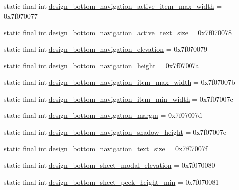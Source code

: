 \begin{CompactItemize}
\item 
static final int \hyperlink{classandroid_1_1support_1_1graphics_1_1drawable_1_1_r_1_1dimen_e7fb8b9626fbe0415f1e3fbb13848d85}{design\_\-bottom\_\-navigation\_\-active\_\-item\_\-max\_\-width} = 0x7f070077
\item 
static final int \hyperlink{classandroid_1_1support_1_1graphics_1_1drawable_1_1_r_1_1dimen_30f5289605b74695929a1f8a3bab29cb}{design\_\-bottom\_\-navigation\_\-active\_\-text\_\-size} = 0x7f070078
\item 
static final int \hyperlink{classandroid_1_1support_1_1graphics_1_1drawable_1_1_r_1_1dimen_83858ab1d4aced4f73dae5b98a084a3f}{design\_\-bottom\_\-navigation\_\-elevation} = 0x7f070079
\item 
static final int \hyperlink{classandroid_1_1support_1_1graphics_1_1drawable_1_1_r_1_1dimen_f8be17b12ea22ec88e5fa56094b23032}{design\_\-bottom\_\-navigation\_\-height} = 0x7f07007a
\item 
static final int \hyperlink{classandroid_1_1support_1_1graphics_1_1drawable_1_1_r_1_1dimen_b6dc3d7032025eedeadc9113a0210506}{design\_\-bottom\_\-navigation\_\-item\_\-max\_\-width} = 0x7f07007b
\item 
static final int \hyperlink{classandroid_1_1support_1_1graphics_1_1drawable_1_1_r_1_1dimen_0c888544ed3e55d1eba64bf35f028dc1}{design\_\-bottom\_\-navigation\_\-item\_\-min\_\-width} = 0x7f07007c
\item 
static final int \hyperlink{classandroid_1_1support_1_1graphics_1_1drawable_1_1_r_1_1dimen_28c6137cce000b1b48f3711627c66abc}{design\_\-bottom\_\-navigation\_\-margin} = 0x7f07007d
\item 
static final int \hyperlink{classandroid_1_1support_1_1graphics_1_1drawable_1_1_r_1_1dimen_dc90ba5af4d48797e285e0fcf4475d49}{design\_\-bottom\_\-navigation\_\-shadow\_\-height} = 0x7f07007e
\item 
static final int \hyperlink{classandroid_1_1support_1_1graphics_1_1drawable_1_1_r_1_1dimen_9be0b2da5d3a0f7f6ccf4e2ddad232c2}{design\_\-bottom\_\-navigation\_\-text\_\-size} = 0x7f07007f
\item 
static final int \hyperlink{classandroid_1_1support_1_1graphics_1_1drawable_1_1_r_1_1dimen_92e854651552b1786fbf66f26521be1f}{design\_\-bottom\_\-sheet\_\-modal\_\-elevation} = 0x7f070080
\item 
static final int \hyperlink{classandroid_1_1support_1_1graphics_1_1drawable_1_1_r_1_1dimen_9691972d32ebde0288110512393ed34d}{design\_\-bottom\_\-sheet\_\-peek\_\-height\_\-min} = 0x7f070081

\end{CompactItemize}

